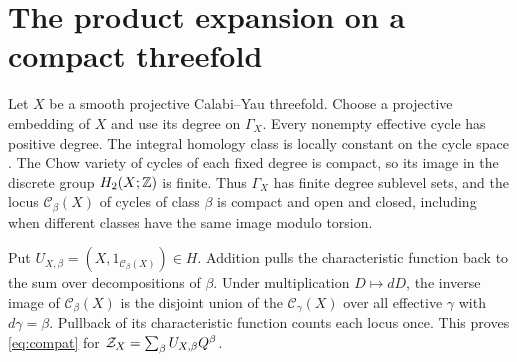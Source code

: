 \section{The product expansion on a compact threefold}\label{sec:factor}

Let $X$ be a smooth projective Calabi--Yau threefold. Choose a
projective embedding of $X$ and use its degree on $\Gamma_X$.
Every nonempty effective cycle has positive degree. The integral
homology class is locally constant on the cycle space
\cite[\S2.1]{Pardon}. The Chow variety of cycles of each fixed degree
is compact, so its image in the discrete group $H_2(X;\mathbb Z)$ is finite.
Thus $\Gamma_X$ has finite degree sublevel sets, and the locus
$\mathscr C_\beta(X)$ of cycles of class $\beta$ is compact and
open and closed, including when different classes have the same
image modulo torsion.

Put $U_{X,\beta}=(X,1_{\mathscr C_\beta(X)})\in H$. Addition pulls the
characteristic function back to the sum over decompositions of $\beta$.
Under multiplication $D\mapsto dD$, the inverse image of
$\mathscr C_\beta(X)$ is the disjoint union of the
$\mathscr C_\gamma(X)$ over all effective $\gamma$ with $d\gamma=\beta$.
Pullback of its characteristic function counts each locus once.
This proves \eqref{eq:compat} for $\mathcal Z_X=\sum_\beta U_{X,\beta}Q^\beta$.

